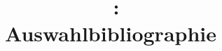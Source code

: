 \documentclass[ngerman]{article}
\begin{document}
\title{\lectype\ \lecfulltitle:\\Auswahlbibliographie}

\author{\lecinstructor}

\date{\lecsemesterverb}

\maketitle

\makesessionbib
\end{document}
